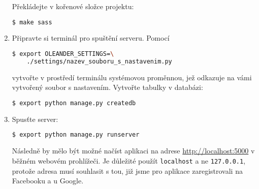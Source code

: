 \documentclass[12pt,oneside,final]{fithesis2}
\begin{document}
\begin{enumerate}
    Překládejte v kořenové složce projektu:

        \begin{lstlisting}[language=bash]
$ make sass
        \end{lstlisting}

    \item Připravte si terminál pro spuštění serveru. Pomocí

        \begin{lstlisting}[language=bash]
$ export OLEANDER_SETTINGS=\
    ./settings/nazev_souboru_s_nastavenim.py
        \end{lstlisting}

        vytvořte v prostředí terminálu systémovou proměnnou, jež odkazuje na vámi vytvořený soubor s nastavením. Vytvořte tabulky v databázi:

        \begin{lstlisting}[language=bash]
$ export python manage.py createdb
        \end{lstlisting}

    \item Spusťte server:

    \begin{lstlisting}[language=bash]
$ export python manage.py runserver
    \end{lstlisting}

    Následně by mělo být možné načíst aplikaci na adrese \url{http://localhost:5000} v běžném webovém prohlížeči. Je důležité použít {\tt localhost} a ne {\tt 127.0.0.1}, protože adresa musí souhlasit s tou, již jsme pro aplikace zaregistrovali na Facebooku a u Google.
\end{enumerate}
\end{document}
